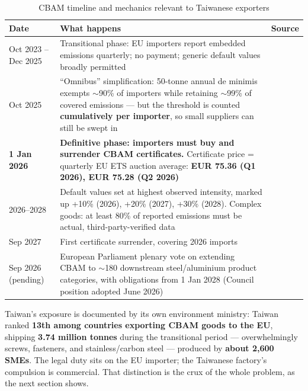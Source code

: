 \begin{table}[htbp]
\caption{CBAM timeline and mechanics relevant to Taiwanese exporters}
\label{tab:timeline}
\small
\begin{tabularx}{\textwidth}{@{}p{}Xp{}@{}}
\toprule
\textbf{Date} & \textbf{What happens} & \textbf{Source} \\
\midrule
Oct 2023 -- Dec 2025 & Transitional phase: EU importers report embedded emissions quarterly; no payment; generic default values broadly permitted & \cite{taxud} \\
Oct 2025 & ``Omnibus'' simplification: 50-tonne annual de minimis exempts $\sim$90\% of importers while retaining $\sim$99\% of covered emissions --- but the threshold is counted \textbf{cumulatively per importer}, so small suppliers can still be swept in & \cite{icap} \\
\textbf{1 Jan 2026} & \textbf{Definitive phase: importers must buy and surrender CBAM certificates.} Certificate price = quarterly EU ETS auction average: \textbf{EUR 75.36 (Q1 2026), EUR 75.28 (Q2 2026)} & \cite{taxud,ecprice} \\
2026--2028 & Default values set at highest observed intensity, marked up +10\% (2026), +20\% (2027), +30\% (2028). Complex goods: at least 80\% of reported emissions must be actual, third-party-verified data & \cite{omm,bpc} \\
Sep 2027 & First certificate surrender, covering 2026 imports & \cite{tpt-cbam} \\
Sep 2026 (pending) & European Parliament plenary vote on extending CBAM to $\sim$180 downstream steel/aluminium product categories, with obligations from 1 Jan 2028 (Council position adopted June 2026) & \cite{akin} \\
\bottomrule
\end{tabularx}
\end{table}

Taiwan's exposure is documented by its own environment ministry: Taiwan ranked
\textbf{13th among countries exporting CBAM goods to the EU}, shipping
\textbf{3.74 million tonnes} during the transitional period --- overwhelmingly
screws, fasteners, and stainless/carbon steel --- produced by \textbf{about
2,600 SMEs}\cite{tpt-cbam}. The legal duty sits on the EU importer; the
Taiwanese factory's compulsion is commercial. That distinction is the crux of
the whole problem, as the next section shows.
